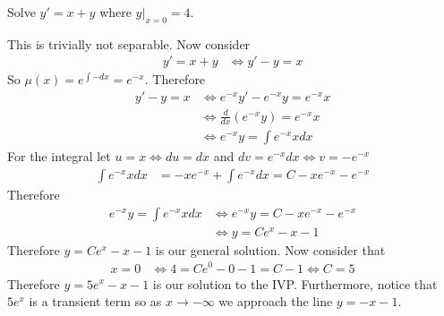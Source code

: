 \documentclass[notes.tex]{subfiles}
\begin{document}
\begin{exercise}
    Solve $y' = x + y$ where $y|_{x = 0} = 4$.
\end{exercise}
\begin{solution}
    This is trivially not separable. Now consider
    \begin{align*}
        y' = x + y
        &\iff y' - y = x
    \end{align*}
    So $\mu(x) = e^{\int -dx} = e^{-x}$. Therefore
    \begin{align*}
        y' - y = x
        &\iff e^{-x}y' - e^{-x}y = e^{-x}x \\
        &\iff \frac{d}{dx}(e^{-x}y) = e^{-x}x \\
        &\iff e^{-x}y = \int e^{-x}x dx
    \end{align*}
    For the integral let $u = x \iff du = dx$ and $dv = e^{-x}dx \iff v = -e^{-x}$
    \begin{align*}
        \int e^{-x}x dx
        &= -x e^{-x} + \int e^{-x}dx
        = C - x e^{-x} - e^{-x}
    \end{align*}
    Therefore
    \begin{align*}
        e^{-x}y = \int e^{-x}x dx
        &\iff e^{-x}y = C - x e^{-x} - e^{-x} \\
        &\iff y = Ce^x - x - 1
    \end{align*}
    Therefore $y = Ce^x - x - 1$ is our general solution. Now consider that
    \begin{align*}
        x = 0
        &\iff 4 = Ce^{0} - 0 - 1 = C - 1
        \iff C = 5
    \end{align*}
    Therefore $y = 5e^x - x - 1$ is our solution to the IVP. Furthermore, notice that $5e^x$ is a transient term so as $x \to -\infty$ we approach the line $y = -x - 1$.
\end{solution}
\end{document}
